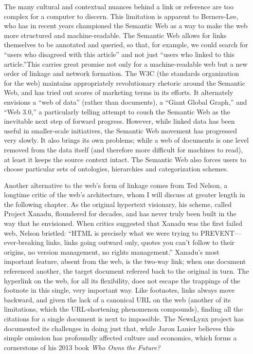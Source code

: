 The many cultural and contextual nuances behind a link or reference are too complex for a computer to discern. This limitation is apparent to Berners-Lee, who has in recent years championed the Semantic Web as a way to make the web more structured and machine-readable. The Semantic Web allows for links themselves to be annotated and queried, so that, for example, we could search for ``users who disagreed with this article'' and not just ``users who linked to this article.''This carries great promise not only for a machine-readable web but a new order of linkage and network formation. The W3C (the standards organization for the web) maintains appropriately revolutionary rhetoric around the Semantic Web, and has tried out scores of marketing terms in its efforts. It alternately envisions a ``web of data'' (rather than documents), a ``Giant Global Graph,'' and ``Web 3.0,'' a particularly telling attempt to couch the Semantic Web as the inevitable next step of forward progress. However, while linked data has been useful in smaller-scale initiatives, the Semantic Web movement has progressed very slowly. It also brings its own problems; while a web of documents is one level removed from the data itself (and therefore more difficult for machines to read), at least it keeps the source context intact. The Semantic Web also forces users to choose particular sets of ontologies, hierarchies and categorization schemes.

Another alternative to the web's form of linkage comes from Ted Nelson, a longtime critic of the web's architecture, whom I will discuss at greater length in the following chapter. As the original hypertext visionary, his scheme, called Project Xanadu, floundered for decades, and has never truly been built in the way that he envisioned. When critics suggested that Xanadu was the first failed web, Nelson bristled: ``HTML is precisely what we were trying to PREVENT---ever-breaking links, links going outward only, quotes you can't follow to their origins, no version management, no rights management.''\autocite{nelson_ted_1999} Xanadu's most important feature, absent from the web, is the two-way link; when one document referenced another, the target document referred back to the original in turn. The hyperlink on the web, for all its flexibility, does not escape the trappings of the footnote in this single, very important way. Like footnotes, links always move backward, and given the lack of a canonical URL on the web (another of its limitations, which the URL-shortening phenomenon compounds), finding all the citations for a single document is next to impossible. The NewsLynx project has documented its challenges in doing just that, while Jaron Lanier believes this simple omission has profoundly affected culture and economics, which forms a cornerstone of his 2013 book \emph{Who Owns the Future?}\autocites[Ch. 18]{lanier_who_2013}{abelson_hyper-compensation:_2014}

